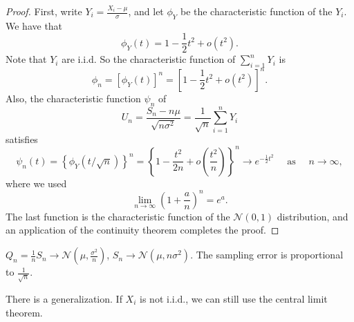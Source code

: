 \begin{proof}
First, write $Y_i = \frac{X_i - \mu}{\sigma}$, and let $\phi_Y$ be the characteristic function of the $Y_i$. We have that 
$$\begin{equation}
    \phi_{Y}(t)=1-\frac{1}{2} t^{2}+o\left(t^{2}\right).
\end{equation}$$
Note that $Y_i$ are i.i.d. So the characteristic function of $\sum_{i=1}^n Y_i$ is
$$\begin{equation}
    \phi_n = [\phi_{Y}(t)]^n = \left[ 1-\frac{1}{2} t^{2}+o\left(t^{2}\right) \right]^n.
\end{equation}$$
Also, the characteristic function $\psi_n$ of
$$\begin{equation}
    U_{n}=\frac{S_{n}-n \mu}{\sqrt{n \sigma^{2}}}=\frac{1}{\sqrt{n}} \sum_{i=1}^{n} Y_{i}
\end{equation}$$
satisfies
$$\begin{equation}
    \psi_{n}(t)=\left\{\phi_{Y}(t / \sqrt{n})\right\}^{n}=\left\{1-\frac{t^{2}}{2 n}+o\left(\frac{t^{2}}{n}\right)\right\}^{n} \rightarrow e^{-\frac{1}{2} t^{2}} \quad \text { as } \quad  n \rightarrow \infty,
\end{equation}$$
where we used 
$$\begin{equation}
    \lim_{n\to\infty} \left( 1 + \frac{a}{n} \right)^n = e^a.
\end{equation}$$
The last function is the characteristic function of the $\mathcal{N}(0, 1)$ distribution, and an application of the continuity theorem completes the proof.
\end{proof}

\begin{corollary}
$Q_n = \frac{1}{n}S_n \to \mathcal{N} \left(\mu, \frac{\sigma^2}{n} \right)$, $S_n \to \mathcal{N}(\mu, n \sigma^2)$. The sampling error is proportional to $\frac{1}{\sqrt{n}}$.
\end{corollary}
There is a generalization. If $X_i$ is not i.i.d., we can still use the central limit theorem.

